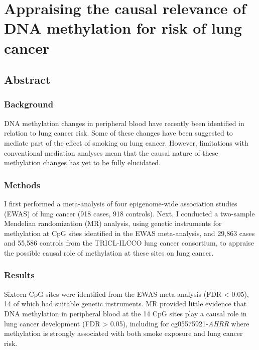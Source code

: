 \documentclass[11pt,oneside]{bristolthesis}
\begin{document}
\hypertarget{dnam-lung-cancer-mr}{%
\chapter{Appraising the causal relevance of DNA methylation for risk of lung cancer}\label{dnam-lung-cancer-mr}}

\hypertarget{abstract-07}{%
\section{Abstract}\label{abstract-07}}

\hypertarget{abstract-background-07}{%
\subsection{Background}\label{abstract-background-07}}

DNA methylation changes in peripheral blood have recently been identified in relation to lung cancer risk. Some of these changes have been suggested to mediate part of the effect of smoking on lung cancer. However, limitations with conventional mediation analyses mean that the causal nature of these methylation changes has yet to be fully elucidated.

\hypertarget{abstract-methods-07}{%
\subsection{Methods}\label{abstract-methods-07}}

I first performed a meta-analysis of four epigenome-wide association studies (EWAS) of lung cancer (918 cases, 918 controls). Next, I conducted a two-sample Mendelian randomization (MR) analysis, using genetic instruments for methylation at CpG sites identified in the EWAS meta-analysis, and 29,863 cases and 55,586 controls from the TRICL-ILCCO lung cancer consortium, to appraise the possible causal role of methylation at these sites on lung cancer.

\hypertarget{abstract-results-07}{%
\subsection{Results}\label{abstract-results-07}}

Sixteen CpG sites were identified from the EWAS meta-analysis (FDR \textless{} 0.05), 14 of which had suitable genetic instruments. MR provided little evidence that DNA methylation in peripheral blood at the 14 CpG sites play a causal role in lung cancer development (FDR \textgreater{} 0.05), including for cg05575921-\emph{AHRR} where methylation is strongly associated with both smoke exposure and lung cancer risk.
\end{document}

